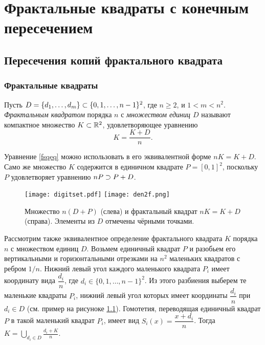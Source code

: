 \newpage
\chapter{Фрактальные квадраты с конечным пересечением}


\section{Пересечения копий фрактального квадрата}


\subsection{Фрактальные квадраты}

\begin{definition}\label{dfn:FS} 
Пусть $D=\{d_1,\ldots,d_m\}\subset\{0,1,\ldots,n-1\}^2$, где $n\ge 2$, и $1<m<n^2$.
{\em Фрактальным квадратом} порядка $n$ с {\em множеством единиц $D$} называют компактное множество $K\subset\mathbb{R}^2$, удовлетворяющее уравнению
\begin{equation}\label{fsqeq}
K=\dfrac{K+D}{n}.
\end{equation}
\end{definition}

Уравнение \eqref{fsqeq} можно использовать в его эквивалентной форме $nK=K+D$.
Само же множество $K$ содержится в единичном квадрате $P=[0,1]^2$, поскольку $P$ удовлетворяет уравнению $nP\supset P+D$.

\begin{figure}[h]
 \centering
 \texttt{[image: digitset.pdf]}
 \hfill
 \texttt{[image: den2f.png]}
 \caption{Множество $n(D+P)$ (слева) и фрактальный квадрат $nK=K+D$ (справа). Элементы из $D$ отмечены чёрными точками.}
 \label{fig:fr_sq}
\end{figure}

Рассмотрим также эквивалентное определение фрактального квадрата $K$ порядка $n$ с множеством единиц $D$.
Возьмем единичный квадрат $P$ и разобьем его вертикальными и горизонтальными отрезками на $n^2$ маленьких квадратов с ребром $1/n$.
Нижний левый угол каждого маленького квадрата $P_i$ имеет координату вида $\dfrac{d_i}{n}$, где $d_i\in\{0,1,\ldots,n-1\}^2$.
Из этого разбиения выберем те маленькие квадраты $P_i$, нижний левый угол которых имеет координаты $\dfrac{d_i}{n}$ при $d_i\in D$ (см. пример на рисуноке \ref{fig:fr_sq}).
Гомотетия, переводящая единичный квадрат $P$ в такой маленький квадрат $P_i$, имеет вид $S_i(x)=\dfrac{x+d_i}{n}$.
Тогда $K=\bigcup\limits_{d_i\in D}\frac{d_i+K}{n}$.

